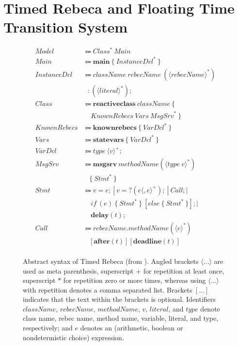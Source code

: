\section{Timed Rebeca and Floating Time Transition System} \label{sec::FTTS}


\begin{figure}[!htbp]
 	\begin{center}
 		\small
 		\begin{mdframed}
 			\begin{align*}
 				\mathit{Model} &\Coloneqq  Class^* ~ Main \qquad \\
 				Main &\Coloneqq \mathbf{main} ~ \{ ~ InstanceDcl^* ~ \} \qquad \\
 				InstanceDcl &\Coloneqq \mathit{className} ~ \mathit{rebecName}~(\langle rebecName \rangle ^*) \\
 							& ~~~ : (\langle literal \rangle ^*);\\
 				Class &\Coloneqq \mathbf{reactiveclass} ~ className ~ \{ \\
 					  &\ ~~~ ~ \mathit{KnownRebecs} ~ \mathit{Vars} ~ \mathit{MsgSrv}^* ~ \}\\
 				KnownRebecs &\Coloneqq \mathbf{knownrebecs} ~ \{ ~ \mathit{VarDcl}^* ~ \} ~ \\
 				\mathit{Vars} &\Coloneqq \mathbf{statevars} ~ \{ ~ \mathit{VarDcl}^* ~ \} ~ \\
 				\mathit{VarDcl} &\Coloneqq type ~ \langle v \rangle ^+;\\
 				MsgSrv &\Coloneqq \mathbf{msgsrv} ~ methodName(\langle type ~ v \rangle ^*) ~\\
				             &\ ~~~  \{ ~ Stmt^* ~ \} \\
 				Stmt &\Coloneqq v = e; ~| ~ v = ?(e\langle ,e \rangle^+); ~| ~ Call;| ~ \\
 					 &\ ~~~  ~ if ~ (e) ~ \{ ~ Stmt^* ~ \} ~ [else ~ \{ ~ Stmt^* ~ \}]; |   \\
					 &\ ~~~ ~ \mathbf{delay}(t); \\
 				Call &\Coloneqq rebecName.methodName(\langle e \rangle ^*) \\
 					 &\ ~~~  [\mathbf{after}(t)]  [\mathbf{deadline}(t)]\\
 			\end{align*}
 		\end{mdframed}
 		\caption{Abstract syntax of Timed Rebeca (from \cite{DBLP:journals/scp/KhamespanahSSKI15}). Angled brackets $\langle$...$\rangle$ are used as meta parenthesis, superscript $+$ for repetition at least once, superscript $*$ for repetition zero or more times, whereas using $\langle$...$\rangle$ with repetition denotes a comma separated list. Brackets $[...]$ indicates that the text within the brackets is optional. Identifiers $className$, $rebecName$, $methodName$, $v$, $literal$, and $type$ denote class name, rebec name, method name, variable, literal, and type, respectively; and $e$ denotes an (arithmetic, boolean or nondetermistic choice) expression.
}
\end{center}
\end{figure}
